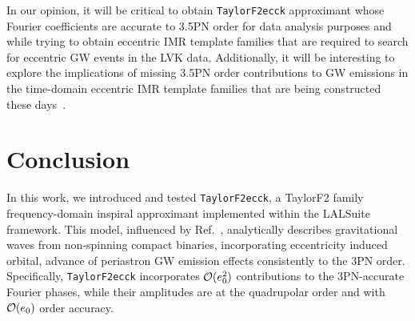 \documentclass[aps,prd,twocolumn,superscriptaddress,groupedaddress,nofootinbib,showpacs,eqsecnum,useAms]{revtex4-2}
\begin{document}
In our opinion, it will be critical to obtain \texttt{TaylorF2ecck} approximant  whose Fourier coefficients are accurate to 3.5PN order for data analysis purposes and while trying to obtain eccentric IMR template families that are required to search for eccentric GW events in the LVK data. Additionally, it will be interesting to explore the implications of missing 3.5PN order contributions to GW emissions in the time-domain eccentric IMR template families that are being constructed these days~\cite{Huerta2018}.

\section{ Conclusion }\label{sec:conclusion}

In this work, we introduced and tested \texttt{TaylorF2ecck}, a TaylorF2 family frequency-domain inspiral approximant implemented within the LALSuite framework. This model, influenced by Ref.~\cite{TGHH}, analytically describes gravitational waves from non-spinning compact binaries, incorporating eccentricity induced orbital, advance of periastron GW emission effects consistently to the 3PN order. Specifically, \texttt{TaylorF2ecck} incorporates ${\cal O}(e_0^2)$ contributions to the 3PN-accurate Fourier phases, while their amplitudes are at the quadrupolar order and with ${\cal O}(e_0)$ order accuracy.
\end{document}

